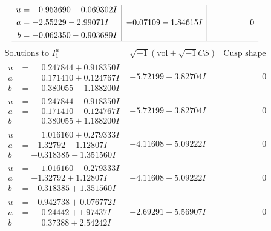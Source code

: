 \documentclass[1p]{elsarticle_modified}
\theoremstyle{definition}
\newcommand{\I}{\sqrt{-1}}
\begin{document}
$$\begin{array}{c|c|c}
\begin{aligned}
u &= -0.953690 - 0.069302 I \\
a &= -2.55229 - 2.99071 I \\
b &= -0.062350 - 0.903689 I\end{aligned}
 & -0.07109 - 1.84615 I & \phantom{-0.000000 } 0\\
 \hline 
 \end{array}$$\newpage$$\begin{array}{c|c|c}  
\text{Solutions to }I^u_{1}& \I (\text{vol} + \sqrt{-1}CS) & \text{Cusp shape}\\
 \hline 
\begin{aligned}
u &= \phantom{-}0.247844 + 0.918350 I \\
a &= \phantom{-}0.171410 + 0.124767 I \\
b &= \phantom{-}0.380055 - 1.188200 I\end{aligned}
 & -5.72199 - 3.82704 I & \phantom{-0.000000 } 0 \\ \hline\begin{aligned}
u &= \phantom{-}0.247844 - 0.918350 I \\
a &= \phantom{-}0.171410 - 0.124767 I \\
b &= \phantom{-}0.380055 + 1.188200 I\end{aligned}
 & -5.72199 + 3.82704 I & \phantom{-0.000000 } 0 \\ \hline\begin{aligned}
u &= \phantom{-}1.016160 + 0.279333 I \\
a &= -1.32792 - 1.12807 I \\
b &= -0.318385 - 1.351560 I\end{aligned}
 & -4.11608 + 5.09222 I & \phantom{-0.000000 } 0 \\ \hline\begin{aligned}
u &= \phantom{-}1.016160 - 0.279333 I \\
a &= -1.32792 + 1.12807 I \\
b &= -0.318385 + 1.351560 I\end{aligned}
 & -4.11608 - 5.09222 I & \phantom{-0.000000 } 0 \\ \hline\begin{aligned}
u &= -0.942738 + 0.076772 I \\
a &= \phantom{-}0.24442 + 1.97437 I \\
b &= \phantom{-}0.37388 + 2.54242 I\end{aligned}
 & -2.69291 - 5.56907 I & \phantom{-0.000000 } 0 \\ \hline\begin{aligned}

\end{aligned}
\end{array}$$
\end{document}
